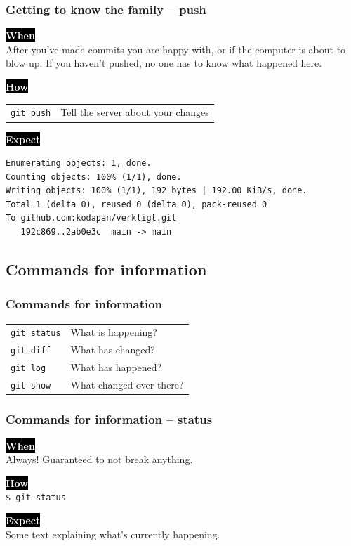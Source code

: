 \documentclass{beamer}
\newcommand{\keyword}[1]{\hspace{-1.0em}\colorbox{black}{\textcolor{white}{\textbf{#1}\vphantom{Ep}}}\vspace{0.2em}} %
\begin{document}
\begin{frame}[fragile]
  \frametitle{Getting to know the family -- push}
  \keyword{When}\\
    After you've made commits you are happy with, or if the computer
    is about to blow up. If you haven't pushed, no one has to know what
    happened here.\\
  \vspace{0.5em}

  \keyword{How}\\
  \hspace{-1.0em}
  \begin{tabular}{ll}
    \texttt{git push} & Tell the server about your changes \\
  \end{tabular}
  \vspace{0.5em}

  \keyword{Expect}\\ [0.1em]
\begin{verbatim}
Enumerating objects: 1, done.
Counting objects: 100% (1/1), done.
Writing objects: 100% (1/1), 192 bytes | 192.00 KiB/s, done.
Total 1 (delta 0), reused 0 (delta 0), pack-reused 0
To github.com:kodapan/verkligt.git
   192c869..2ab0e3c  main -> main
\end{verbatim}
\end{frame}

\subsection{Commands for information}

\begin{frame}[fragile]
  \frametitle{Commands for information}

  \begin{tabular}{ll}
    \texttt{git status} & What is happening? \\
    \texttt{git diff} & What has changed? \\
    \texttt{git log} & What has happened? \\
    \texttt{git show} & What changed over there? \\
  \end{tabular}

\end{frame}

\begin{frame}
  \frametitle{Commands for information -- status}

  \keyword{When}\\
  Always! Guaranteed to not break anything.
  \vspace{0.5em}

  \keyword{How}\\
  \texttt{\$ git status}
  \vspace{0.5em}

  \keyword{Expect}\\
  Some text explaining what's currently happening.
\end{frame}
\end{document}
